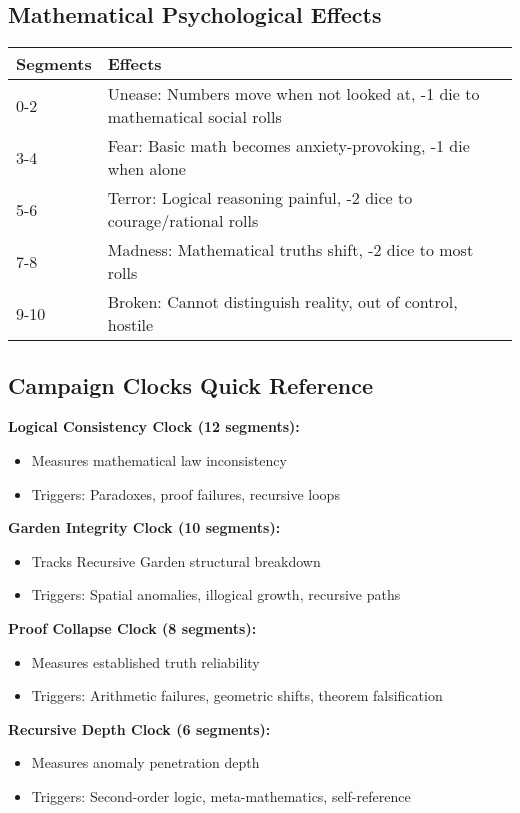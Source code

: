 \documentclass[11pt]{article}
\begin{document}
\subsection*{Mathematical Psychological Effects}

\begin{tabular}{|p{2cm}|p{10cm}|}
\hline
\rowcolor{tableheader}
\textbf{Segments} & \textbf{Effects} \\
\hline
0-2 & Unease: Numbers move when not looked at, -1 die to mathematical social rolls \\
3-4 & Fear: Basic math becomes anxiety-provoking, -1 die when alone \\
5-6 & Terror: Logical reasoning painful, -2 dice to courage/rational rolls \\
7-8 & Madness: Mathematical truths shift, -2 dice to most rolls \\
9-10 & Broken: Cannot distinguish reality, out of control, hostile \\
\hline
\end{tabular}

\subsection*{Campaign Clocks Quick Reference}

\textbf{Logical Consistency Clock (12 segments):}
\begin{itemize}
\item Measures mathematical law inconsistency
\item Triggers: Paradoxes, proof failures, recursive loops
\end{itemize}

\textbf{Garden Integrity Clock (10 segments):}
\begin{itemize}
\item Tracks Recursive Garden structural breakdown
\item Triggers: Spatial anomalies, illogical growth, recursive paths
\end{itemize}

\textbf{Proof Collapse Clock (8 segments):}
\begin{itemize}
\item Measures established truth reliability
\item Triggers: Arithmetic failures, geometric shifts, theorem falsification
\end{itemize}

\textbf{Recursive Depth Clock (6 segments):}
\begin{itemize}
\item Measures anomaly penetration depth
\item Triggers: Second-order logic, meta-mathematics, self-reference
\end{itemize}
\end{document}
